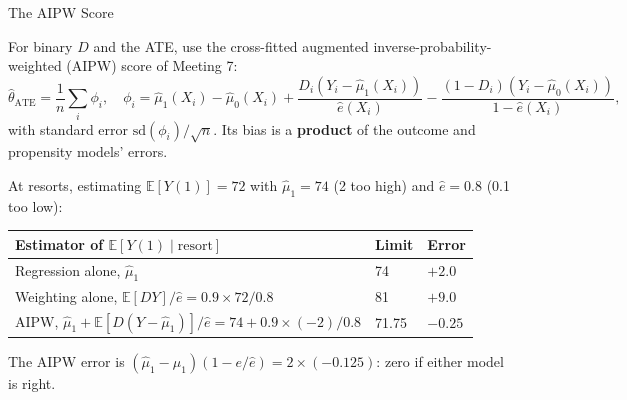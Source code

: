 \documentclass[aspectratio=169, 11pt, handout]{beamer}
\newcommand{\E}{\mathbb{E}}
\newcommand{\ATE}{\text{ATE}}
\begin{document}
\begin{frame}{The AIPW Score}

For binary $D$ and the ATE, use the cross-fitted augmented inverse-probability-weighted (AIPW) score of Meeting 7:
\[
  \hat\theta_{\ATE} = \frac1n\sum_i\phi_i, \quad
  \phi_i = \hat\mu_1(X_i) - \hat\mu_0(X_i) + \frac{D_i(Y_i - \hat\mu_1(X_i))}{\hat e(X_i)} - \frac{(1-D_i)(Y_i - \hat\mu_0(X_i))}{1 - \hat e(X_i)},
\]
with standard error $\text{sd}(\phi_i)/\sqrt n$. Its bias is a \textbf{product} of the outcome and propensity models' errors.

\medskip

At resorts, estimating $\E[Y(1)] = 72$ with $\hat\mu_1 = 74$ (2 too high) and $\hat e = 0.8$ (0.1 too low):

\begin{center}
\small
\begin{tabular}{lll}
\toprule
\textbf{Estimator of $\E[Y(1) \mid \text{resort}]$} & \textbf{Limit} & \textbf{Error} \\
\midrule
Regression alone, $\hat\mu_1$ & 74 & $+2.0$ \\
Weighting alone, $\E[DY]/\hat e = 0.9 \times 72/0.8$ & 81 & $+9.0$ \\
AIPW, $\hat\mu_1 + \E[D(Y - \hat\mu_1)]/\hat e = 74 + 0.9 \times (-2)/0.8$ & 71.75 & $-0.25$ \\
\bottomrule
\end{tabular}
\end{center}

\smallskip
The AIPW error is $(\hat\mu_1 - \mu_1)(1 - e/\hat e) = 2 \times (-0.125)$: zero if either model is right.
\end{frame}
\end{document}
